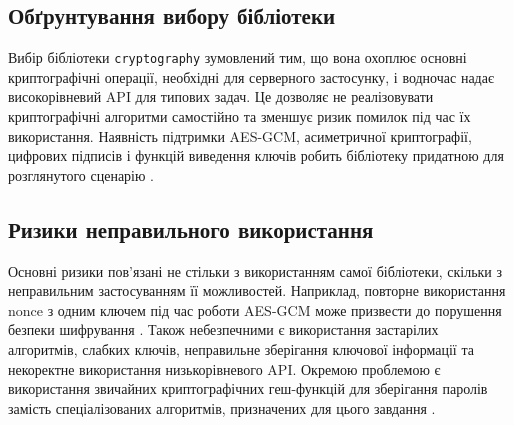 \subsection{Обґрунтування вибору бібліотеки}

Вибір бібліотеки \texttt{cryptography} зумовлений тим, що вона охоплює
основні криптографічні операції, необхідні для серверного застосунку, і
водночас надає високорівневий API для типових задач. Це дозволяє не
реалізовувати криптографічні алгоритми самостійно та зменшує ризик помилок
під час їх використання. Наявність підтримки AES-GCM, асиметричної криптографії, цифрових підписів
і функцій виведення ключів робить бібліотеку придатною для розглянутого
сценарію \cite{cryptography}.

\subsection{Ризики неправильного використання}

Основні ризики пов'язані не стільки з використанням самої бібліотеки,
скільки з неправильним застосуванням її можливостей. Наприклад, повторне
використання nonce з одним ключем під час роботи AES-GCM може призвести до
порушення безпеки шифрування \cite{cryptography}.
Також небезпечними є використання застарілих алгоритмів, слабких ключів,
неправильне зберігання ключової інформації та некоректне використання
низькорівневого API. Окремою проблемою є використання звичайних
криптографічних геш-функцій для зберігання паролів замість спеціалізованих
алгоритмів, призначених для цього завдання \cite{OWASP}.

